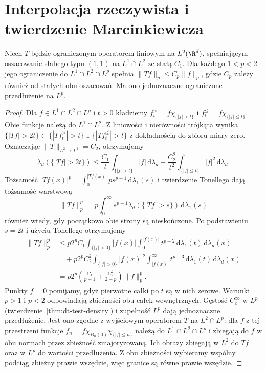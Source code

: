\section{Interpolacja rzeczywista i twierdzenie Marcinkiewicza}
\providecommand{\atlasref}[2]{#2}

\begin{lemat}
\label{lem:dt-cz-interp}
Niech $T$ będzie ograniczonym operatorem liniowym
na $L^2(\R^d)$, spełniającym oszacowanie słabego typu
$(1,1)$ na $L^1\cap L^2$ ze stałą $C_1$.
Dla każdego $1<p<2$ jego ograniczenie do
$L^1\cap L^2\cap L^p$ spełnia
$\|Tf\|_p\le C_p\|f\|_p$, gdzie $C_p$ zależy również
od stałych obu oszacowań. Ma ono jednoznaczne
ograniczone przedłużenie na $L^p$.
\end{lemat}
\begin{proof}
Dla $f\in L^1\cap L^2\cap L^p$ i $t>0$ kładziemy
$f_t^{>}=f\chi_{\{|f|>t\}}$ i
$f_t^{\le}=f\chi_{\{|f|\le t\}}$.
Obie funkcje należą do $L^1\cap L^2$.
Z liniowości i nierówności trójkąta wynika
$\{|Tf|>2t\}\subset\{|Tf_t^{>}|>t\}
\cup\{|Tf_t^{\le}|>t\}$ z dokładnością do zbioru
miary zero. Oznaczając $\|T\|_{L^2\to L^2}=C_2$,
otrzymujemy
\[
 \lambda_d(\{|Tf|>2t\})
 \le \frac{C_1}{t}\int_{\{|f|>t\}}|f|\,\mathrm d\lambda_d
 +\frac{C_2^2}{t^2}\int_{\{|f|\le t\}}|f|^2\,\mathrm d\lambda_d .
\]
Tożsamość
$|Tf(x)|^p=\int_0^{|Tf(x)|}p s^{p-1}\,\mathrm d\lambda_1(s)$
i twierdzenie Tonellego dają tożsamość warstwową
\[
 \|Tf\|_p^p=p\int_0^\infty s^{p-1}
 \lambda_d(\{|Tf|>s\})\,\mathrm d\lambda_1(s)
\]
również wtedy, gdy początkowo obie strony są nieskończone.
Po podstawieniu $s=2t$ i użyciu Tonellego otrzymujemy
\[
 \begin{aligned}
 \|Tf\|_p^p
 &\le p2^p C_1\int_{\{|f|>0\}} |f(x)|
       \int_0^{|f(x)|}t^{p-2}\,\mathrm d\lambda_1(t)
       \,\mathrm d\lambda_d(x)\\
 &\quad+p2^p C_2^2\int_{\{|f|>0\}} |f(x)|^2
       \int_{|f(x)|}^\infty t^{p-3}\,\mathrm d\lambda_1(t)
       \,\mathrm d\lambda_d(x)\\
 &=p2^p\left(\frac{C_1}{p-1}+\frac{C_2^2}{2-p}\right)
   \|f\|_p^p .
 \end{aligned}
\]
Punkty $f=0$ pomijamy, gdyż pierwotne całki po $t$
są w nich zerowe. Warunki $p>1$ i $p<2$ odpowiadają
zbieżności obu całek wewnętrznych.
Gęstość $C_c^\infty$ w $L^p$
(twierdzenie~\ref{thm:dt-test-density}) i zupełność $L^p$
dają jednoznaczne przedłużenie.
Jest ono zgodne z wyjściowym operatorem $T$ na
$L^2\cap L^p$: dla $f$ z tej przestrzeni funkcje
$f_n=f\chi_{B_n(0)}\chi_{\{|f|\le n\}}$
należą do $L^1\cap L^2\cap L^p$ i zbiegają do $f$
w obu normach przez zbieżność zmajoryzowaną.
Ich obrazy zbiegają w $L^2$ do $Tf$ oraz w $L^p$
do wartości przedłużenia. Z obu zbieżności wybieramy
wspólny podciąg zbieżny prawie wszędzie, więc granice
są równe prawie wszędzie.
\end{proof}
